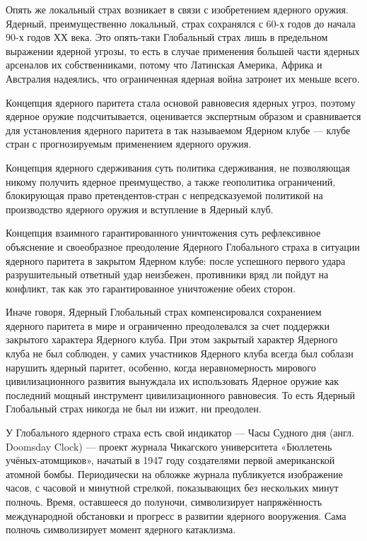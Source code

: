Опять же локальный страх возникает в связи с изобретением ядерного оружия.
Ядерный, преимущественно локальный, страх сохранялся с 60-х годов до начала
90-х годов ХХ века. Это опять-таки Глобальный страх лишь в предельном выражении
ядерной угрозы, то есть в случае применения большей части ядерных арсеналов их
собственниками, потому что Латинская Америка, Африка и Австралия надеялись, что
ограниченная ядерная война затронет их меньше всего.

Концепция ядерного паритета стала основой равновесия ядерных угроз, поэтому
ядерное оружие подсчитывается, оценивается экспертным образом и сравнивается
для установления ядерного паритета в так называемом Ядерном клубе — клубе стран
с прогнозируемым применением ядерного оружия.

Концепция ядерного сдерживания суть политика сдерживания, не позволяющая никому
получить ядерное преимущество, а также геополитика ограничений, блокирующая
право претендентов-стран с непредсказуемой политикой на производство ядерного
оружия и вступление в Ядерный клуб.

Концепция взаимного гарантированного уничтожения суть рефлексивное объяснение и
своеобразное преодоление Ядерного Глобального страха в ситуации ядерного
паритета в закрытом Ядерном клубе: после успешного первого удара разрушительный
ответный удар неизбежен, противники вряд ли пойдут на конфликт, так как это
гарантированное уничтожение обеих сторон.

Иначе говоря, Ядерный Глобальный страх компенсировался сохранением ядерного
паритета в мире и ограниченно преодолевался за счет поддержки закрытого
характера Ядерного клуба. При этом закрытый характер Ядерного клуба не был
соблюден, у самих участников Ядерного клуба всегда был соблазн нарушить ядерный
паритет, особенно, когда неравномерность мирового цивилизационного развития
вынуждала их использовать Ядерное оружие как последний мощный инструмент
цивилизационного равновесия. То есть Ядерный Глобальный страх никогда не был ни
изжит, ни преодолен.

У Глобального ядерного страха есть свой индикатор — Часы Судного дня (англ.
Doomsday Clock) — проект журнала Чикагского университета «Бюллетень
учёных-атомщиков», начатый в 1947 году создателями первой американской атомной
бомбы. Периодически на обложке журнала публикуется изображение часов, с часовой
и минутной стрелкой, показывающих без нескольких минут полночь. Время,
оставшееся до полуночи, символизирует напряжённость международной обстановки и
прогресс в развитии ядерного вооружения. Сама полночь символизирует момент
ядерного катаклизма.

